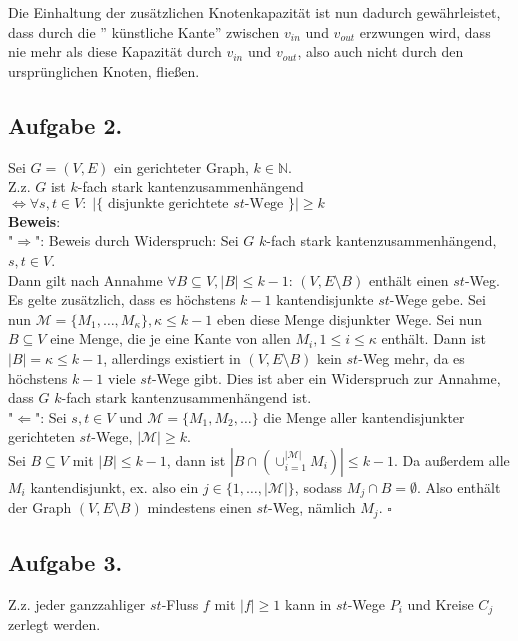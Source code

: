 \documentclass[11pt,a4paper,ngerman]{article}
\begin{document}
\begin{enumerate}[a)]
Die Einhaltung der zusätzlichen Knotenkapazität ist nun dadurch gewährleistet,
dass durch die '' künstliche Kante'' zwischen $v_{in}$ und $v_{out}$ erzwungen wird,
dass nie mehr als diese Kapazität durch $v_{in}$ und $v_{out}$, also auch nicht 
durch den ursprünglichen Knoten, fließen.
\end{enumerate}

\subsection*{Aufgabe 2.}
Sei $G = (V,E)$ ein gerichteter Graph, $k \in \mathbb{N}$. \\
Z.z. $G$ ist $k$-fach stark kantenzusammenhängend \\
  $\Leftrightarrow \forall s,t \in V: \; \left|\{ \text{ disjunkte gerichtete $st$-Wege } \}\right| \geq k$ \\

\textbf{Beweis}: \\
"$\Rightarrow$": Beweis durch Widerspruch: Sei $G$ $k$-fach stark kantenzusammenhängend, $s,t \in V$. \\
Dann gilt nach Annahme $\forall B \subseteq V, |B| \leq k-1: \, (V,E \setminus B)$ enthält einen $st$-Weg.
Es gelte zusätzlich, dass es höchstens $k-1$ kantendisjunkte $st$-Wege gebe. Sei nun $\mathcal{M} = \{M_1,\ldots,M_\kappa \}, \kappa \leq k-1$ eben diese Menge disjunkter Wege. Sei nun $B \subseteq V$ eine Menge, die je eine Kante von allen $M_i, 1 \leq i \leq \kappa$ enthält. Dann ist $|B| = \kappa \leq k-1$, allerdings
existiert in $(V,E \setminus B)$ kein $st$-Weg mehr, da es höchstens $k-1$ viele $st$-Wege gibt. Dies ist aber ein Widerspruch zur Annahme, dass $G$ $k$-fach stark kantenzusammenhängend ist. \\

"$\Leftarrow$": Sei $s,t \in V$ und $\mathcal{M} = \{M_1, M_2, \ldots \}$ die Menge aller kantendisjunkter gerichteten $st$-Wege, $|\mathcal{M}| \geq k$.\\
Sei $B \subseteq V$ mit $|B| \leq k-1$, dann ist $|B \cap \left(\cup_{i=1}^{|\mathcal{M}|} M_i\right)| \leq k-1$.
Da außerdem alle $M_i$ kantendisjunkt, ex. also ein $j \in \{1,\ldots,|\mathcal{M}| \}$, sodass $M_j \cap B = \emptyset$.
Also enthält der Graph $(V, E \setminus B)$ mindestens einen $st$-Weg, nämlich $M_j$.
\mbox{} \hfill $\square$
\subsection*{Aufgabe 3.}
Z.z. jeder ganzzahliger $st$-Fluss $f$ mit $|f| \geq 1$ kann in $st$-Wege $P_i$ und Kreise $C_j$ zerlegt werden.
\end{document}
